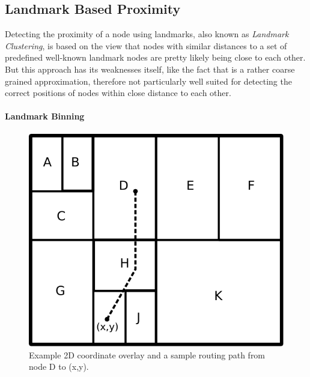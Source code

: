 \subsection{Landmark Based Proximity}\label{sec:landmark}

Detecting the proximity of a node using landmarks, also known as
\textit{Landmark Clustering}, is based on the view that nodes with similar
distances to a set of predefined well-known landmark nodes are pretty likely
being close to each other. But this approach has its weaknesses itself, like the
fact that is a rather coarse grained approximation, therefore not particularly
well suited for detecting the correct positions of nodes within close distance
to each other.

\paragraph*{\bf Landmark Binning}\label{sec:landmark_binning}
\begin{figure}
\centering
  \includegraphics[scale=0.4]{img/algorithms/landmark_binning}
\caption{Example 2D coordinate overlay and a sample routing path from node D to
(x,y).}
\label{fig:landmark_binning}
\end{figure}

